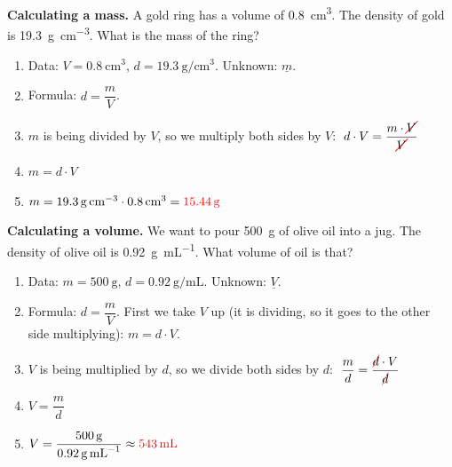 \begin{example}
    \textbf{Calculating a mass.} A gold ring has a volume of \qty{0.8}{\cubic\cm}. The density of gold is \qty{19.3}{\g\per\cubic\cm}. What is the mass of the ring?
    \begin{enumerate}[label=\numberballmDarkTeal]
        \item Data: \(V = \qty{0.8}{\cubic\cm}\), \(d = \qty{19.3}{\g\per\cubic\cm}\). Unknown: \(\underline{m}\).
        \item Formula: \(d = \dfrac{m}{V}\).
        \item \(m\) is being divided by \(V\), so we multiply both sides by \(V\):
        \(\;d \cdot V = \dfrac{m \cdot \cancelred{V}}{\cancelred{V}}\)
        \item \(m = d \cdot V\)
        \item \(m = \qty{19.3}{\g\per\cubic\cm} \cdot \qty{0.8}{\cubic\cm} = \textcolor{red}{\qty{15.44}{\g}}\)
    \end{enumerate}
\end{example}

\begin{example}
    \textbf{Calculating a volume.} We want to pour \qty{500}{\g} of olive oil into a jug. The density of olive oil is \qty{0.92}{\g\per\mL}. What volume of oil is that?
    \begin{enumerate}[label=\numberballmDarkTeal]
        \item Data: \(m = \qty{500}{\g}\), \(d = \qty{0.92}{\g\per\mL}\). Unknown: \(\underline{V}\).
        \item Formula: \(d = \dfrac{m}{V}\). First we take \(V\) up (it is dividing, so it goes to the other side multiplying): \(m = d \cdot V\).
        \item \(V\) is being multiplied by \(d\), so we divide both sides by \(d\):
        \(\;\dfrac{m}{d} = \dfrac{\cancelred{d} \cdot V}{\cancelred{d}}\)
        \item \(V = \dfrac{m}{d}\)
        \item \(V = \dfrac{\qty{500}{\g}}{\qty{0.92}{\g\per\mL}} \approx \textcolor{red}{\qty{543}{\mL}}\)
    \end{enumerate}
\end{example}

